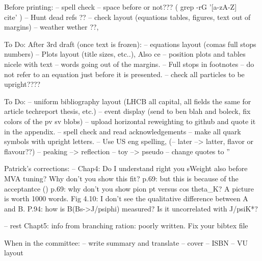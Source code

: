 Before printing:
-- spell check
-- space before \cite{} or not??? ( grep -rG  '[a-zA-Z]\\cite' )
-- Hunt dead refs ??
-- check layout (equations tables, figures, text out of margins)
-- weather wether ??,

To Do: After 3rd draft (once text is frozen):
-- equations layout (comas full stops numbers)
-- Plots layout (title sizes, etc..), Also ce
-- position plots and tables nicele with text
-- words going out of the margins.
-- Full stops in footnotes
-- do not refer to an equation just before it is presented.
-- check all particles to be upright????


To Do:
-- uniform bibliography layout (LHCB all capital, all fields the same for article techreport thesis, etc.)
-- event display (send to ben blah and boleck, fix colors of the pv sv blobs)
-- upload horizontal reweighting to github and quote it in the appendix.
-- spell check and read acknowledgements
-- make all quark symbols with upright letters.
-- Use US eng spelling, (-- later --> latter, flavor or flavour??)
-- peaking --> reflection
-- toy --> pseudo
-- change quotes to ''

Patrick's corrections:
-- Chap4:
Do I understand right you sWeight also before MVA tuning? Why don't you show this fit?
p.69: but this is because of the acceptantce ()
p.69: why don't you show pion pt versus cos theta_K? A picture is worth 1000 words.
Fig 4.10: I don't see the qualitative difference between A and B.
P.94: how is B(Bs->J/psiphi) measured? Is it uncorrelated with J/psiK*?

-- rest
Chapt5: info from branching ration: poorly written.
Fix your bibtex file

When in the committee:
-- write summary and translate
-- cover
-- ISBN
-- VU layout
